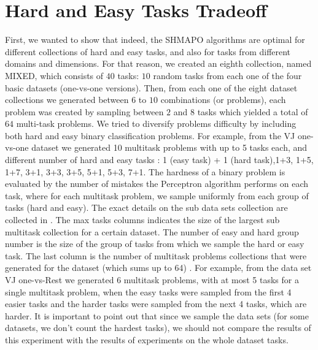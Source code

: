 \section{Hard and Easy Tasks Tradeoff}
First, we wanted to show that indeed, the SHMAPO algorithms are optimal for different collections of hard and
 easy tasks, and also for tasks from different domains and dimensions. For that reason, we created an eighth 
 collection, named MIXED, which consists of $40$ tasks: $10$ random tasks from each one of the four 
 basic datasets (one-vs-one versions). Then, from each one of the eight dataset collections we generated 
 between $6$ to $10$ combinations (or problems), each problem was created by sampling between 
 $2$ and $8$ tasks which yielded a total of $64$ multi-task problems. 
We tried to diversify problems difficulty by including both hard and easy binary classification problems.
For example, from the VJ one-vs-one dataset we generated 10 multitask problems with up to 5 tasks each, and different 
number of hard and easy tasks : 1 (easy task) + 1 (hard task),1+3, 1+5, 1+7, 3+1, 3+3, 3+5, 5+1, 5+3, 7+1.
The hardness of a binary problem is evaluated by the number of mistakes the Perceptron algorithm performs 
on each task, where for each multitask problem, we sample uniformly from each group of tasks 
(hard and easy). The exact details on the sub data sets collection are collected 
in . The max tasks columns indicates the size of the largest sub multitask collection 
for a certain dataset. The number of easy and hard group number is the size of 
the group of tasks from which we sample the hard or easy task. The last column 
is the number of multitask problems collections that were generated for the dataset (which sums up to 64) . 
For example, from the data set VJ one-vs-Rest we generated 6 multitask problems, 
with at most 5 tasks for a single multitask problem, when the easy tasks were 
sampled from the first 4 easier tasks and the harder tasks were sampled from the 
next 4 tasks, which are harder. It is important to point out that since we 
sample the data sets (for some datasets, we don't count the hardest tasks), we should not compare the 
results of this experiment with the results of experiments on the whole dataset tasks.

